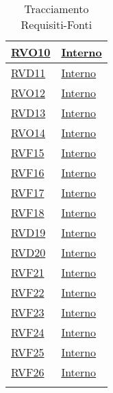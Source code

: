 \begin{longtable}{|>{\centering}m{5cm}|m{5cm}<{\centering}|}
\hyperlink{RVO10}{RVO10} & \hyperlink{Interno}{Interno}\\ \hline

\hyperlink{RVD11}{RVD11} & \hyperlink{Interno}{Interno}\\ \hline

\hyperlink{RVO12}{RVO12} & \hyperlink{Interno}{Interno}\\ \hline

\hyperlink{RVD13}{RVD13} & \hyperlink{Interno}{Interno}\\ \hline

\hyperlink{RVO14}{RVO14} & \hyperlink{Interno}{Interno}\\ \hline

\hyperlink{RVF15}{RVF15} & \hyperlink{Interno}{Interno}\\ \hline

\hyperlink{RVF16}{RVF16} & \hyperlink{Interno}{Interno}\\ \hline

\hyperlink{RVF17}{RVF17} & \hyperlink{Interno}{Interno}\\ \hline

\hyperlink{RVF18}{RVF18} & \hyperlink{Interno}{Interno}\\ \hline

\hyperlink{RVD19}{RVD19} & \hyperlink{Interno}{Interno}\\ \hline

\hyperlink{RVD20}{RVD20} & \hyperlink{Interno}{Interno}\\ \hline

\hyperlink{RVF21}{RVF21} & \hyperlink{Interno}{Interno}\\ \hline

\hyperlink{RVF22}{RVF22} & \hyperlink{Interno}{Interno}\\ \hline

\hyperlink{RVF23}{RVF23} & \hyperlink{Interno}{Interno}\\ \hline

\hyperlink{RVF24}{RVF24} & \hyperlink{Interno}{Interno}\\ \hline

\hyperlink{RVF25}{RVF25} & \hyperlink{Interno}{Interno}\\ \hline

\hyperlink{RVF26}{RVF26} & \hyperlink{Interno}{Interno}\\ \hline

\caption[Tracciamento Requisiti-Fonti]{Tracciamento Requisiti-Fonti}
\label{tabella:requi-fonti}
\end{longtable}
\clearpage
